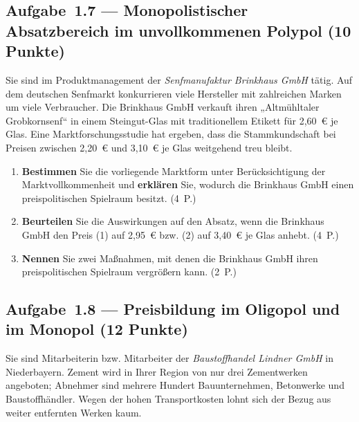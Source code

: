 \subsection*{Aufgabe~1.7 --- Monopolistischer Absatzbereich im unvollkommenen Polypol (10 Punkte)}

Sie sind im Produktmanagement der \emph{Senfmanufaktur Brinkhaus GmbH} tätig. Auf dem
deutschen Senfmarkt konkurrieren viele Hersteller mit zahlreichen Marken um viele
Verbraucher. Die Brinkhaus GmbH verkauft ihren „Altmühltaler Grobkornsenf`` in einem
Steingut-Glas mit traditionellem Etikett für 2,60~€ je Glas. Eine Marktforschungsstudie
hat ergeben, dass die Stammkundschaft bei Preisen zwischen 2,20~€ und 3,10~€ je Glas
weitgehend treu bleibt.

\begin{enumerate}[label=\alph*)]
  \item \textbf{Bestimmen} Sie die vorliegende Marktform unter Berücksichtigung der
    Marktvollkommenheit und \textbf{erklären} Sie, wodurch die Brinkhaus GmbH einen
    preispolitischen Spielraum besitzt. \hfill (4~P.)
  \item \textbf{Beurteilen} Sie die Auswirkungen auf den Absatz, wenn die Brinkhaus GmbH
    den Preis (1) auf 2,95~€ bzw. (2) auf 3,40~€ je Glas anhebt. \hfill (4~P.)
  \item \textbf{Nennen} Sie zwei Maßnahmen, mit denen die Brinkhaus GmbH ihren
    preispolitischen Spielraum vergrößern kann. \hfill (2~P.)
\end{enumerate}

\subsection*{Aufgabe~1.8 --- Preisbildung im Oligopol und im Monopol (12 Punkte)}

Sie sind Mitarbeiterin bzw. Mitarbeiter der \emph{Baustoffhandel Lindner GmbH} in
Niederbayern. Zement wird in Ihrer Region von nur drei Zementwerken angeboten; Abnehmer
sind mehrere Hundert Bauunternehmen, Betonwerke und Baustoffhändler. Wegen der hohen
Transportkosten lohnt sich der Bezug aus weiter entfernten Werken kaum.

